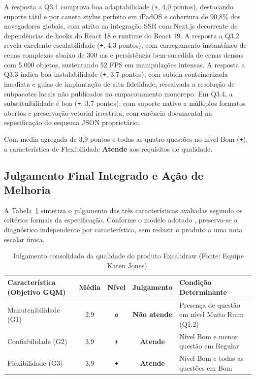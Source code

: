 \documentclass[12pt]{article}
\begin{document}
A resposta a Q3.1 comprova boa adaptabilidade (\texttt{+}, 4,0 pontos), destacando suporte tátil e por caneta stylus perfeito em iPadOS e cobertura de 90,8\% dos navegadores globais, com atrito na integração SSR com Next.js decorrente de dependências de hooks do React 18 e runtime do React 19. A resposta a Q3.2 revela excelente escalabilidade (\texttt{+}, 4,3 pontos), com carregamento instantâneo de cenas complexas abaixo de 300 ms e persistência bem-sucedida de cenas densas com 5.000 objetos, sustentando 52 FPS em manipulações intensas. A resposta a Q3.3 indica boa instalabilidade (\texttt{+}, 3,7 pontos), com subida conteinerizada imediata e guias de implantação de alta fidelidade, ressalvada a resolução de subpacotes locais não publicados no empacotamento monorepo. Em Q3.4, a substituibilidade é boa (\texttt{+}, 3,7 pontos), com suporte nativo a múltiplos formatos abertos e preservação vetorial irrestrita, com carência documental na especificação do esquema JSON proprietário.

Com média agregada de 3,9 pontos e todas as quatro questões no nível Bom (\texttt{+}), a característica de Flexibilidade \textbf{Atende} aos requisitos de qualidade.

\subsection{Julgamento Final Integrado e Ação de Melhoria}
\label{subsec:julgamento-melhoria}

A Tabela~\ref{tab:julgamento_consolidado} sintetiza o julgamento das três características avaliadas segundo os critérios formais da especificação. Conforme o modelo adotado \cite{heitlager2007}, preserva-se o diagnóstico independente por característica, sem reduzir o produto a uma nota escalar única.

\begin{table}[!ht]
\centering
\caption{Julgamento consolidado da qualidade do produto Excalidraw (Fonte: Equipe Karen Jones).}
\label{tab:julgamento_consolidado}
\vspace{2pt}
\scriptsize
\begin{tabular}{lcccl}
\toprule
\textbf{Característica (Objetivo GQM)} & \textbf{Média} & \textbf{Nível} & \textbf{Julgamento} & \textbf{Condição Determinante} \\
\midrule
Manutenibilidade (G1) & 2,9 & \texttt{o} & \textbf{Não atende} & Presença de questão em nível Muito Ruim (Q1.2) \\
Confiabilidade (G2)   & 3,9 & \texttt{+} & \textbf{Atende}     & Nível Bom e menor questão em Regular \\
Flexibilidade (G3)     & 3,9 & \texttt{+} & \textbf{Atende}     & Nível Bom e todas as questões em Bom \\
\bottomrule
\end{tabular}
\end{table}
\end{document}
